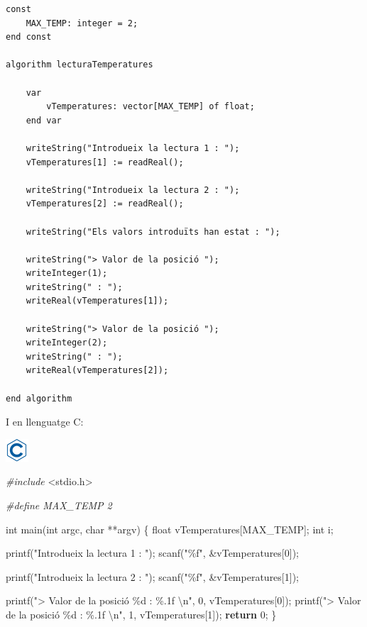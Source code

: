 \documentclass[
]{book}
\newenvironment{Shaded}{\begin{snugshade}}{\end{snugshade}}
\newcommand{\ControlFlowTok}[1]{\textcolor[rgb]{0.13,0.29,0.53}{\textbf{#1}}}
\newcommand{\DataTypeTok}[1]{\textcolor[rgb]{0.13,0.29,0.53}{#1}}
\newcommand{\DecValTok}[1]{\textcolor[rgb]{0.00,0.00,0.81}{#1}}
\newcommand{\ImportTok}[1]{#1}
\newcommand{\NormalTok}[1]{#1}
\newcommand{\PreprocessorTok}[1]{\textcolor[rgb]{0.56,0.35,0.01}{\textit{#1}}}
\newcommand{\SpecialCharTok}[1]{\textcolor[rgb]{0.00,0.00,0.00}{#1}}
\newcommand{\StringTok}[1]{\textcolor[rgb]{0.31,0.60,0.02}{#1}}
\begin{document}
\begin{verbatim}
const
    MAX_TEMP: integer = 2;
end const

algorithm lecturaTemperatures

    var
        vTemperatures: vector[MAX_TEMP] of float;
    end var

    writeString("Introdueix la lectura 1 : ");
    vTemperatures[1] := readReal();

    writeString("Introdueix la lectura 2 : ");
    vTemperatures[2] := readReal();
    
    writeString("Els valors introduïts han estat : ");
    
    writeString("> Valor de la posició ");
    writeInteger(1);
    writeString(" : ");
    writeReal(vTemperatures[1]);
    
    writeString("> Valor de la posició ");
    writeInteger(2);
    writeString(" : ");
    writeReal(vTemperatures[2]);

end algorithm
\end{verbatim}

I en llenguatge C:

\includegraphics{./img/c.png}

\begin{Shaded}
\begin{Highlighting}[]
\PreprocessorTok{\#include }\ImportTok{\textless{}stdio.h\textgreater{}}

\PreprocessorTok{\#define MAX\_TEMP 2}

\DataTypeTok{int}\NormalTok{ main(}\DataTypeTok{int}\NormalTok{ argc, }\DataTypeTok{char}\NormalTok{ **argv) \{}
    \DataTypeTok{float}\NormalTok{ vTemperatures[MAX\_TEMP];}
    \DataTypeTok{int}\NormalTok{ i;}

\NormalTok{    printf(}\StringTok{"Introdueix la lectura 1 : "}\NormalTok{);}
\NormalTok{    scanf(}\StringTok{"\%f"}\NormalTok{, \&vTemperatures[}\DecValTok{0}\NormalTok{]);}

\NormalTok{    printf(}\StringTok{"Introdueix la lectura 2 : "}\NormalTok{);}
\NormalTok{    scanf(}\StringTok{"\%f"}\NormalTok{, \&vTemperatures[}\DecValTok{1}\NormalTok{]);}
    
\NormalTok{    printf(}\StringTok{"\textgreater{} Valor de la posició \%d : \%.1f }\SpecialCharTok{\textbackslash{}n}\StringTok{"}\NormalTok{, }\DecValTok{0}\NormalTok{, vTemperatures[}\DecValTok{0}\NormalTok{]);}
\NormalTok{    printf(}\StringTok{"\textgreater{} Valor de la posició \%d : \%.1f }\SpecialCharTok{\textbackslash{}n}\StringTok{"}\NormalTok{, }\DecValTok{1}\NormalTok{, vTemperatures[}\DecValTok{1}\NormalTok{]);}
    \ControlFlowTok{return} \DecValTok{0}\NormalTok{;}
\NormalTok{\}}
\end{Highlighting}
\end{Shaded}
\end{document}
